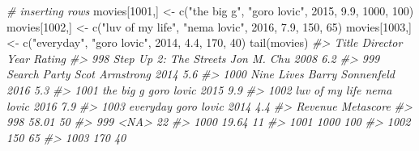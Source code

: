 \documentclass[
]{book}
\newenvironment{Shaded}{\begin{snugshade}}{\end{snugshade}}
\newcommand{\CommentTok}[1]{\textcolor[rgb]{0.56,0.35,0.01}{\textit{#1}}}
\newcommand{\DecValTok}[1]{\textcolor[rgb]{0.00,0.00,0.81}{#1}}
\newcommand{\FloatTok}[1]{\textcolor[rgb]{0.00,0.00,0.81}{#1}}
\newcommand{\FunctionTok}[1]{\textcolor[rgb]{0.00,0.00,0.00}{#1}}
\newcommand{\NormalTok}[1]{#1}
\newcommand{\OtherTok}[1]{\textcolor[rgb]{0.56,0.35,0.01}{#1}}
\newcommand{\StringTok}[1]{\textcolor[rgb]{0.31,0.60,0.02}{#1}}
\begin{document}
\begin{Shaded}
\begin{Highlighting}[]
\CommentTok{\# inserting rows}
\NormalTok{movies[}\DecValTok{1001}\NormalTok{,] }\OtherTok{\textless{}{-}} \FunctionTok{c}\NormalTok{(}\StringTok{"the big g"}\NormalTok{, }\StringTok{"goro lovic"}\NormalTok{, }\DecValTok{2015}\NormalTok{, }\FloatTok{9.9}\NormalTok{, }\DecValTok{1000}\NormalTok{, }\DecValTok{100}\NormalTok{)}
\NormalTok{movies[}\DecValTok{1002}\NormalTok{,] }\OtherTok{\textless{}{-}} \FunctionTok{c}\NormalTok{(}\StringTok{"luv of my life"}\NormalTok{, }\StringTok{"nema lovic"}\NormalTok{, }\DecValTok{2016}\NormalTok{, }\FloatTok{7.9}\NormalTok{, }\DecValTok{150}\NormalTok{, }\DecValTok{65}\NormalTok{)}
\NormalTok{movies[}\DecValTok{1003}\NormalTok{,] }\OtherTok{\textless{}{-}} \FunctionTok{c}\NormalTok{(}\StringTok{"everyday"}\NormalTok{, }\StringTok{"goro lovic"}\NormalTok{, }\DecValTok{2014}\NormalTok{, }\FloatTok{4.4}\NormalTok{, }\DecValTok{170}\NormalTok{, }\DecValTok{40}\NormalTok{)}
\FunctionTok{tail}\NormalTok{(movies)}
\CommentTok{\#\textgreater{}                       Title         Director Year Rating}
\CommentTok{\#\textgreater{} 998  Step Up 2: The Streets       Jon M. Chu 2008    6.2}
\CommentTok{\#\textgreater{} 999            Search Party   Scot Armstrong 2014    5.6}
\CommentTok{\#\textgreater{} 1000             Nine Lives Barry Sonnenfeld 2016    5.3}
\CommentTok{\#\textgreater{} 1001              the big g       goro lovic 2015    9.9}
\CommentTok{\#\textgreater{} 1002         luv of my life       nema lovic 2016    7.9}
\CommentTok{\#\textgreater{} 1003               everyday       goro lovic 2014    4.4}
\CommentTok{\#\textgreater{}      Revenue Metascore}
\CommentTok{\#\textgreater{} 998    58.01        50}
\CommentTok{\#\textgreater{} 999     \textless{}NA\textgreater{}        22}
\CommentTok{\#\textgreater{} 1000   19.64        11}
\CommentTok{\#\textgreater{} 1001    1000       100}
\CommentTok{\#\textgreater{} 1002     150        65}
\CommentTok{\#\textgreater{} 1003     170        40}


\end{Highlighting}
\end{Shaded}
\end{document}
